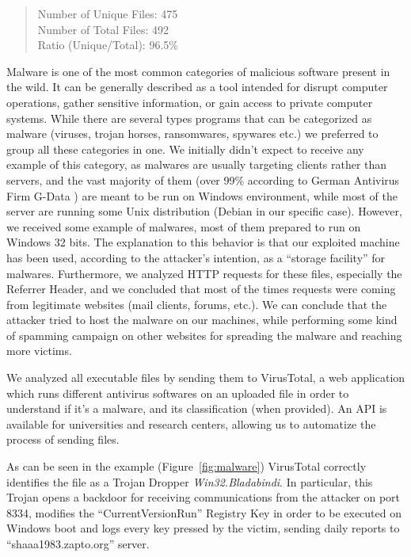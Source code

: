\begin{quote}
Number of Unique Files: 475\\
Number of Total Files: 492\\
Ratio (Unique/Total): 96.5\%
\end{quote}

Malware is one of the most common categories of malicious software present in the wild. It can be generally described as a tool intended for disrupt computer operations, gather sensitive information, or gain access to private computer systems. While there are several types programs that can be categorized as malware (viruses, trojan horses, ransomwares, spywares etc.) we preferred to group all these categories in one. We initially didn't expect to receive any example of this category, as malwares are usually targeting clients rather than servers, and the vast majority of them (over 99\% according to German Antivirus Firm G-Data \cite{malwWin}) are meant to be run on Windows environment, while most of the server are running some Unix distribution (Debian in our specific case). However, we received some example of malwares, most of them prepared to run on Windows 32 bits. The explanation to this behavior is that our exploited machine has been used, according to the attacker's intention, as a ``storage facility'' for malwares. Furthermore, we analyzed HTTP requests for these files, especially the Referrer Header, and we concluded that most of the times requests were coming from legitimate websites (mail clients, forums, etc.). We can conclude that the attacker tried to host the malware on our machines, while performing some kind of spamming campaign on other websites for spreading the malware and reaching more victims.

We analyzed all executable files by sending them to VirusTotal, a web application which runs different antivirus softwares on an uploaded file in order to understand if it's a malware, and its classification (when provided). An API is available for universities and research centers, allowing us to automatize the process of sending files.

As can be seen in the example (Figure~\ref{fig:malware}) VirusTotal correctly identifies the file as a Trojan Dropper \emph{Win32.Bladabindi}. In particular, this Trojan opens a backdoor for receiving communications from the attacker on port 8334, modifies the ``CurrentVersionRun'' Registry Key in order to be executed on Windows boot and logs every key pressed by the victim, sending daily reports to ``shaaa1983.zapto.org'' server.


